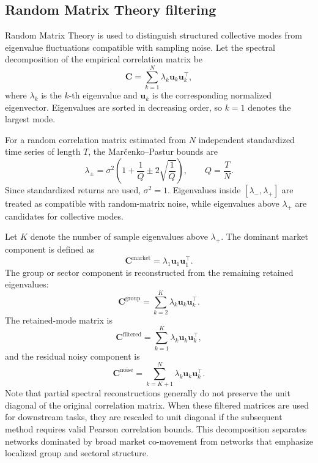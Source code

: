 \subsection{Random Matrix Theory filtering}
\label{subsec:rmt_method}

Random Matrix Theory is used to distinguish structured collective modes from eigenvalue fluctuations compatible with sampling noise. Let the spectral decomposition of the empirical correlation matrix be
\begin{equation}
\mathbf{C}
=
\sum_{k=1}^{N}
\lambda_k
\mathbf{u}_k
\mathbf{u}_k^{\top},
\end{equation}
where $\lambda_k$ is the $k$-th eigenvalue and $\mathbf{u}_k$ is the corresponding normalized eigenvector. Eigenvalues are sorted in decreasing order, so $k=1$ denotes the largest mode.

For a random correlation matrix estimated from $N$ independent standardized time series of length $T$, the Mar\v{c}enko--Pastur bounds are
\begin{equation}
\lambda_{\pm}
=
\sigma^2
\left(
1+\frac{1}{Q}
\pm
2\sqrt{\frac{1}{Q}}
\right),
\qquad
Q=\frac{T}{N}.
\end{equation}
Since standardized returns are used, $\sigma^2=1$. Eigenvalues inside $[\lambda_-,\lambda_+]$ are treated as compatible with random-matrix noise, while eigenvalues above $\lambda_+$ are candidates for collective modes.

Let $K$ denote the number of sample eigenvalues above $\lambda_+$. The dominant market component is defined as
\begin{equation}
\mathbf{C}^{\mathrm{market}}
=
\lambda_1
\mathbf{u}_1
\mathbf{u}_1^{\top}.
\end{equation}
The group or sector component is reconstructed from the remaining retained eigenvalues:
\begin{equation}
\mathbf{C}^{\mathrm{group}}
=
\sum_{k=2}^{K}
\lambda_k
\mathbf{u}_k
\mathbf{u}_k^{\top}.
\end{equation}
The retained-mode matrix is
\begin{equation}
\mathbf{C}^{\mathrm{filtered}}
=
\sum_{k=1}^{K}
\lambda_k
\mathbf{u}_k
\mathbf{u}_k^{\top},
\end{equation}
and the residual noisy component is
\begin{equation}
\mathbf{C}^{\mathrm{noise}}
=
\sum_{k=K+1}^{N}
\lambda_k
\mathbf{u}_k
\mathbf{u}_k^{\top}.
\end{equation}
Note that partial spectral reconstructions generally do not preserve the unit diagonal of the original correlation matrix. When these filtered matrices are used for downstream tasks, they are rescaled to unit diagonal if the subsequent method requires valid Pearson correlation bounds. This decomposition separates networks dominated by broad market co-movement from networks that emphasize localized group and sectoral structure.

